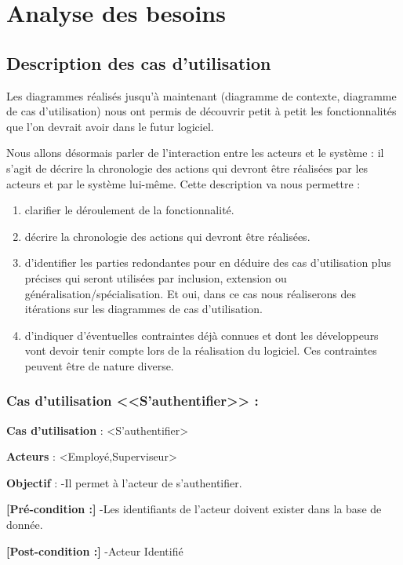 	\section{Analyse des besoins}
	
\subsection{Description des cas d'utilisation}
	Les diagrammes réalisés jusqu'à maintenant (diagramme de contexte, diagramme de cas d'utilisation) nous ont permis de découvrir petit à petit les fonctionnalités que l'on devrait avoir dans le futur logiciel.
	
	Nous allons désormais parler de l'interaction entre les acteurs et le système : il s'agit de décrire la chronologie des actions qui devront être réalisées par les acteurs et par le système lui-même. Cette description va nous permettre :
	
\begin{enumerate}[label=\textbullet]
	\item clarifier le déroulement de la fonctionnalité.
	\item décrire la chronologie des actions qui devront être réalisées.
	\item d'identifier les parties redondantes pour en déduire des cas d'utilisation plus précises qui seront utilisées par inclusion, extension ou généralisation/spécialisation. Et oui, dans ce cas nous réaliserons des itérations sur les diagrammes de cas d'utilisation.
	\item d'indiquer d'éventuelles contraintes déjà connues et dont les développeurs vont devoir tenir compte lors de la réalisation du logiciel. Ces contraintes peuvent être de nature diverse.
	\end{enumerate}
	
	\subsubsection*{Cas d'utilisation <<S'authentifier>> :}
	\textbf{Cas d'utilisation} :  <S'authentifier>
	
	\textbf{Acteurs} :  <Employé,Superviseur>
	
	\textbf{Objectif} : -Il permet à l'acteur de s'authentifier.
	
	\textbf{[Pré-condition :]}  -Les identifiants de l'acteur doivent exister dans la base de donnée.
	
	\textbf{[Post-condition :]}  -Acteur Identifié	
	
